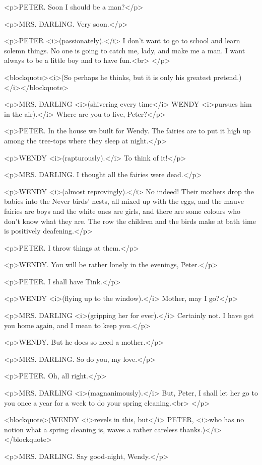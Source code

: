 <p>PETER. Soon I should be a man?</p>

<p>MRS. DARLING. Very soon.</p>

<p>PETER <i>(passionately).</i> I don't want to go to school and
learn solemn things. No one is going to catch me, lady, and make me a
man. I want always to be a little boy and to have fun.<br>
</p>

<blockquote><i>(So perhaps he thinks, but it is only his greatest
pretend.)</i></blockquote>

<p>MRS. DARLING <i>(shivering every time</i> WENDY <i>pursues him in
the air).</i> Where are you to live, Peter?</p>

<p>PETER. In the house we built for Wendy. The fairies are to put it
high up among the tree-tops where they sleep at night.</p>

<p>WENDY <i>(rapturously).</i> To think of it!</p>

<p>MRS. DARLING. I thought all the fairies were dead.</p>

<p>WENDY <i>(almost reprovingly).</i> No indeed! Their mothers drop
the babies into the Never birds' nests, all mixed up with the eggs,
and the mauve fairies are boys and the white ones are girls, and
there are some colours who don't know what they are. The row the
children and the birds make at bath time is positively deafening.</p>

<p>PETER. I throw things at them.</p>

<p>WENDY. You will be rather lonely in the evenings, Peter.</p>

<p>PETER. I shall have Tink.</p>

<p>WENDY <i>(flying up to the window).</i> Mother, may I go?</p>

<p>MRS. DARLING <i>(gripping her for ever).</i> Certainly not. I have
got you home again, and I mean to keep you.</p>

<p>WENDY. But he does so need a mother.</p>

<p>MRS. DARLING. So do you, my love.</p>

<p>PETER. Oh, all right.</p>

<p>MRS. DARLING <i>(magnanimously).</i> But, Peter, I shall let her
go to you once a year for a week to do your spring cleaning.<br>
</p>

<blockquote>(WENDY <i>revels in this, but</i> PETER, <i>who has no
notion what a spring cleaning is, waves a rather careless
thanks.)</i></blockquote>

<p>MRS. DARLING. Say good-night, Wendy.</p>

